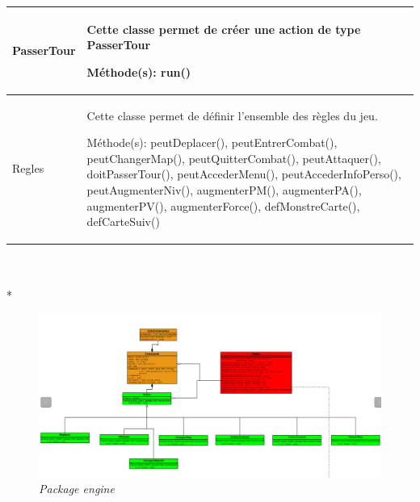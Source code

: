 \documentclass[11pt, a4paper]{article}
\begin{document}
\begin{tabularx}{\textwidth}{ |l|X| }
 PasserTour & Cette classe permet de créer une action de type PasserTour
 
Méthode(s): run()
  \\
\hline

    Regles & Cette classe permet de définir l'ensemble des règles du jeu.
    
Méthode(s): peutDeplacer(), peutEntrerCombat(), peutChangerMap(), peutQuitterCombat(), peutAttaquer(), doitPasserTour(), peutAccederMenu(), peutAccederInfoPerso(), peutAugmenterNiv(), augmenterPM(), augmenterPA(), augmenterPV(), augmenterForce(), defMonstreCarte(), defCarteSuiv()
  \\
\hline

\end{tabularx}\\ \\*

\begin{figure}[H]
  \centering
  \includegraphics[scale=0.35]{img/engine.png}
  \caption{\emph{Package engine}}
\end{figure}
\end{document}

